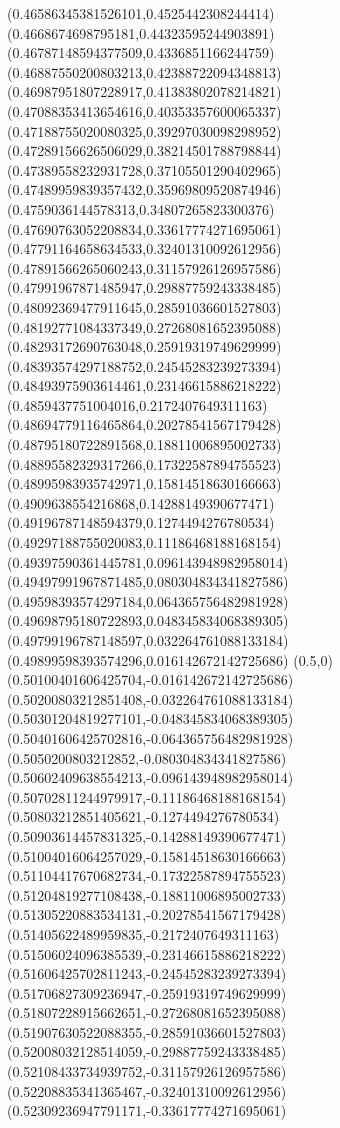 \documentclass[12pt]{article}
\theoremstyle{plain}
\theoremstyle{definition}
\theoremstyle{remark}
\begin{document}
\begin{figure}
{  (0.46586345381526101,0.4525442308244414)%
  (0.4668674698795181,0.44323595244903891)%
  (0.46787148594377509,0.4336851166244759)%
  (0.46887550200803213,0.42388722094348813)%
  (0.46987951807228917,0.41383802078214821)%
  (0.47088353413654616,0.40353357600065337)%
  (0.47188755020080325,0.39297030098298952)%
  (0.47289156626506029,0.38214501788798844)%
  (0.47389558232931728,0.37105501290402965)%
  (0.47489959839357432,0.35969809520874946)%
  (0.4759036144578313,0.34807265823300376)%
  (0.47690763052208834,0.33617774271695061)%
  (0.47791164658634533,0.32401310092612956)%
  (0.47891566265060243,0.31157926126957586)%
  (0.47991967871485947,0.29887759243338485)%
  (0.48092369477911645,0.28591036601527803)%
  (0.48192771084337349,0.27268081652395088)%
  (0.48293172690763048,0.25919319749629999)%
  (0.48393574297188752,0.24545283239273394)%
  (0.48493975903614461,0.23146615886218222)%
  (0.4859437751004016,0.2172407649311163)%
  (0.48694779116465864,0.20278541567179428)%
  (0.48795180722891568,0.18811006895002733)%
  (0.48895582329317266,0.17322587894755523)%
  (0.48995983935742971,0.15814518630166663)%
  (0.4909638554216868,0.14288149390677471)%
  (0.49196787148594379,0.1274494276780534)%
  (0.49297188755020083,0.11186468188168154)%
  (0.49397590361445781,0.096143948982958014)%
  (0.49497991967871485,0.080304834341827586)%
  (0.49598393574297184,0.064365756482981928)%
  (0.49698795180722893,0.048345834068389305)%
  (0.49799196787148597,0.032264761088133184)%
  (0.49899598393574296,0.016142672142725686)%
  (0.5,0)%
  (0.50100401606425704,-0.016142672142725686)%
  (0.50200803212851408,-0.032264761088133184)%
  (0.50301204819277101,-0.048345834068389305)%
  (0.50401606425702816,-0.064365756482981928)%
  (0.5050200803212852,-0.080304834341827586)%
  (0.50602409638554213,-0.096143948982958014)%
  (0.50702811244979917,-0.11186468188168154)%
  (0.50803212851405621,-0.1274494276780534)%
  (0.50903614457831325,-0.14288149390677471)%
  (0.51004016064257029,-0.15814518630166663)%
  (0.51104417670682734,-0.17322587894755523)%
  (0.51204819277108438,-0.18811006895002733)%
  (0.51305220883534131,-0.20278541567179428)%
  (0.51405622489959835,-0.2172407649311163)%
  (0.51506024096385539,-0.23146615886218222)%
  (0.51606425702811243,-0.24545283239273394)%
  (0.51706827309236947,-0.25919319749629999)%
  (0.51807228915662651,-0.27268081652395088)%
  (0.51907630522088355,-0.28591036601527803)%
  (0.52008032128514059,-0.29887759243338485)%
  (0.52108433734939752,-0.31157926126957586)%
  (0.52208835341365467,-0.32401310092612956)%
  (0.52309236947791171,-0.33617774271695061)%
}
\end{figure}
\end{document}
